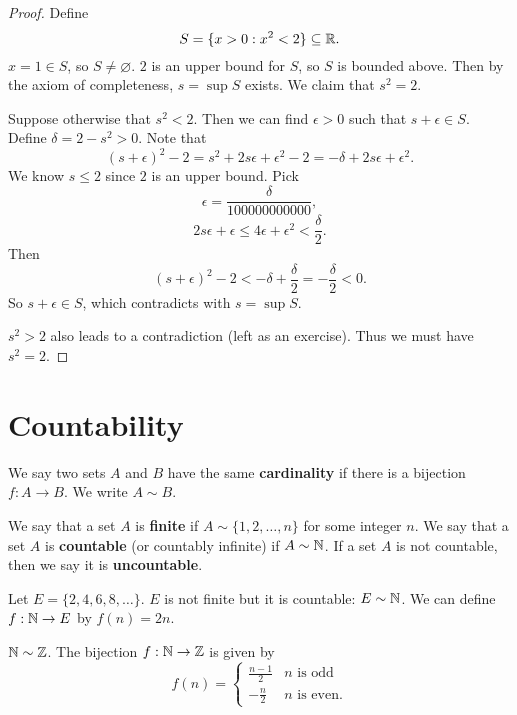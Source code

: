 \begin{proof}
  Define
  \[S = \{x > 0 : x^2 < 2\} \subseteq \mathbb{R}.\]
  $x = 1 \in S$, so $S \ne \varnothing$. $2$ is an upper
  bound for $S$, so $S$ is bounded above. Then by the
  axiom of completeness, $s = \sup S$ exists.
  We claim that $s^2 = 2$. 

  Suppose otherwise that $s^2 < 2$. Then we can find
  $\epsilon > 0$ such that $s + \epsilon \in S$.
  Define $\delta = 2 - s^2 > 0$. Note that
  \[(s + \epsilon)^2 - 2 = s^2 + 2s\epsilon + \epsilon^2 - 2 = -\delta + 2s\epsilon + \epsilon^2.\]
  We know $s \le 2$ since $2$ is an upper bound. 
  Pick
  \[\epsilon = \frac{\delta}{100000000000},\]
  \[
  2s\epsilon + \epsilon \le 4\epsilon + \epsilon^2 < \frac{\delta}{2}
  .\]
  Then
  \[
  (s + \epsilon)^2 - 2 < -\delta + \frac{\delta}{2}
  = -\frac{\delta}{2} < 0
  .\]
  So $s + \epsilon \in S$, which contradicts with
  $s = \sup S$.

  $s^2 > 2$ also leads to a contradiction
  (left as an exercise). Thus we must have $s^2 = 2$.
\end{proof}

\section{Countability}
\begin{definition}
  We say two sets $A$ and $B$ have the same
  \textbf{cardinality}
  if there is a bijection $f : A \to B$.
  We write $A \sim B$.
\end{definition}

\begin{definition}
  We say that a set $A$  is \textbf{finite} if
  $A \sim \{1, 2, \dots, n\}$ for some integer $n$.
  We say that a set $A$ is \textbf{countable}
  (or countably infinite) if
  $A \sim \mathbb{N}$.
  If a set $A$ is not countable, then we say it is
  \textbf{uncountable}.
\end{definition}

\begin{example}
  Let $E = \{2, 4, 6, 8, \dots\}$.
  $E$ is not finite but it is countable: $E \sim \mathbb{N}$.
  We can define $f : \mathbb{N} \to E$ by $f(n) = 2n$.
\end{example}

\begin{example}
  $\mathbb{N} \sim \mathbb{Z}$. 
  The bijection $f : \mathbb{N} \to \mathbb{Z}$ is given by
  \[
  f(n) =
  \begin{cases}
    \frac{n-1}{2} & \text{$n$ is odd} \\
    -\frac{n}{2} & \text{$n$ is even}.
  \end{cases}
  \]
\end{example}

